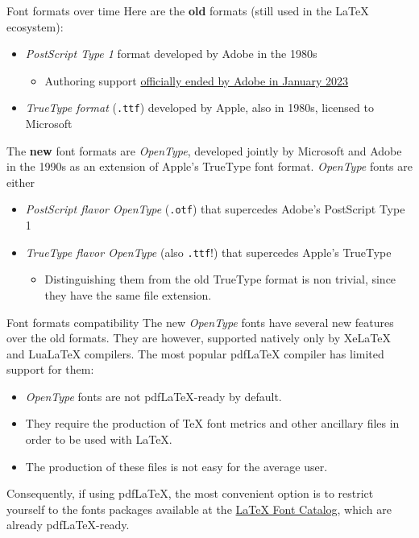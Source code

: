 \documentclass{beamer}
\newcommand{\hrefcol}[2]{\textcolor{uihteal}{\href{#1}{#2}}}
\begin{document}
\begin{frame}{Font formats over time}
Here are the \textbf{old} formats (still used in the LaTeX ecosystem):

\begin{itemize}
\item \emph{PostScript Type 1} format developed by Adobe in the 1980s
\begin{itemize}
    \item Authoring support \hrefcol{https://helpx.adobe.com/fonts/kb/postscript-type-1-fonts-end-of-support.html}{officially ended by Adobe in January 2023}
\end{itemize}
\item \emph{TrueType format} (\texttt{.ttf}) developed by Apple, also in 1980s, licensed to Microsoft
\end{itemize}

The \textbf{new} font formats are \emph{OpenType}, developed jointly by Microsoft and Adobe in the 1990s as an extension of Apple's TrueType font format. \emph{OpenType} fonts are either

\begin{itemize}
\item \emph{PostScript flavor OpenType} (\texttt{.otf}) that supercedes Adobe's PostScript Type 1
\item \emph{TrueType flavor OpenType} (also \texttt{.ttf}!) that supercedes Apple's TrueType
    \begin{itemize}
    \item Distinguishing them from the old TrueType format is non trivial, since they have the same file extension.
    \end{itemize}
\end{itemize}
\end{frame}


\begin{frame}{Font formats compatibility}
The new \emph{OpenType} fonts have several new features over the old formats. They are however, supported natively only by XeLaTeX and LuaLaTeX compilers. The most popular pdfLaTeX compiler has limited support for them:
\begin{itemize}
\item \emph{OpenType} fonts are not pdfLaTeX-ready by default.
\item They require the production of TeX font metrics and other ancillary files in order to be used with LaTeX.
\item The production of these files is not easy for the average user.
\end{itemize}
Consequently, if using pdfLaTeX, the most convenient option is to restrict yourself to the fonts packages available at the \hrefcol{https://tug.org/FontCatalogue/}{LaTeX Font Catalog}, which are already pdfLaTeX-ready.
\end{frame}
\end{document}
